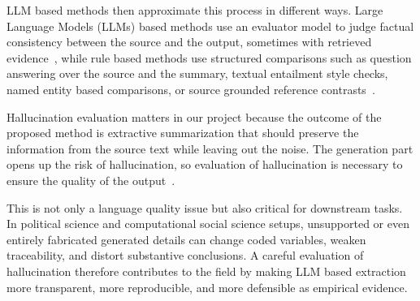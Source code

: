 \documentclass{article}
\begin{document}
LLM based methods then approximate this process in different ways. Large Language Models (LLMs) based methods use an evaluator model to judge factual consistency between the source and the output, sometimes with retrieved evidence~\cite{Liu_etal2023}, while rule based methods use structured comparisons such as question answering over the source and the summary, textual entailment style checks, named entity based comparisons, or source grounded reference contrasts~\cite{Laban_etal2022,Lee_etal2022}.

Hallucination evaluation matters in our project because the outcome of the proposed method is extractive summarization that should preserve the information from the source text while leaving out the noise. The generation part opens up the risk of hallucination, so evaluation of hallucination is necessary to ensure the quality of the output~\cite{Zhang_etal2025}.

This is not only a language quality issue but also critical for downstream tasks. In political science and computational social science setups, unsupported or even entirely fabricated generated details can change coded variables, weaken traceability, and distort substantive conclusions. A careful evaluation of hallucination therefore contributes to the field by making LLM based extraction more transparent, more reproducible, and more defensible as empirical evidence.

%
\end{document}
